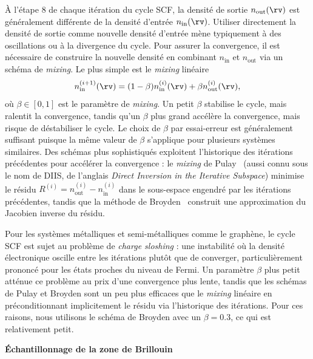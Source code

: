 À l'étape 8 de chaque itération du cycle SCF, la densité de sortie $n_\text{out}(\rv)$ est généralement différente de la densité d'entrée $n_\text{in}(\rv)$. Utiliser directement la densité de sortie comme nouvelle densité d'entrée mène typiquement à des oscillations ou à la divergence du cycle. Pour assurer la convergence, il est nécessaire de construire la nouvelle densité en combinant $n_\text{in}$ et $n_\text{out}$ via un schéma de \textit{mixing}. Le plus simple est le \textit{mixing} linéaire
\begin{equation}
    n_\text{in}^{(i+1)}(\rv)=(1-\beta)n_\text{in}^{(i)}(\rv)+\beta n_\text{out}^{(i)}(\rv),
    \label{eqn:c2_mixing_lineaire}
\end{equation}
où $\beta\in[0,1]$ est le paramètre de \textit{mixing}. Un petit $\beta$ stabilise le cycle, mais ralentit la convergence, tandis qu'un $\beta$ plus grand accélère la convergence, mais risque de déstabiliser le cycle. Le choix de $\beta$ par essai-erreur est généralement suffisant puisque la même valeur de $\beta$ s'applique pour plusieurs systèmes similaires. Des schémas plus sophistiqués exploitent l'historique des itérations précédentes pour accélérer la convergence : le \textit{mixing} de Pulay~\cite{pulayConvergenceAccelerationIterative1980} (aussi connu sous le nom de DIIS, de l'anglais \textit{Direct Inversion in the Iterative Subspace}) minimise le résidu $R^{(i)}=n_\text{out}^{(i)}-n_\text{in}^{(i)}$ dans le sous-espace engendré par les itérations
précédentes, tandis que la méthode de Broyden~\cite{Broyden1965Class} construit une approximation du Jacobien inverse du résidu. 

Pour les systèmes métalliques et semi-métalliques comme le graphène, le cycle SCF est sujet au problème de \textit{charge sloshing} : une instabilité où la densité électronique oscille entre les itérations plutôt que de converger, particulièrement prononcé pour les états proches du niveau de Fermi. Un paramètre $\beta$ plus petit atténue ce problème au prix d'une convergence plus lente, tandis que les schémas de Pulay et Broyden sont un peu plus efficaces que le \textit{mixing} linéaire en préconditionnant implicitement le résidu via l'historique des itérations. Pour ces raisons, nous utilisons le schéma de Broyden avec un $\beta=0.3$, ce qui est relativement petit.

\noindent\textbf{Échantillonnage de la zone de Brillouin}

